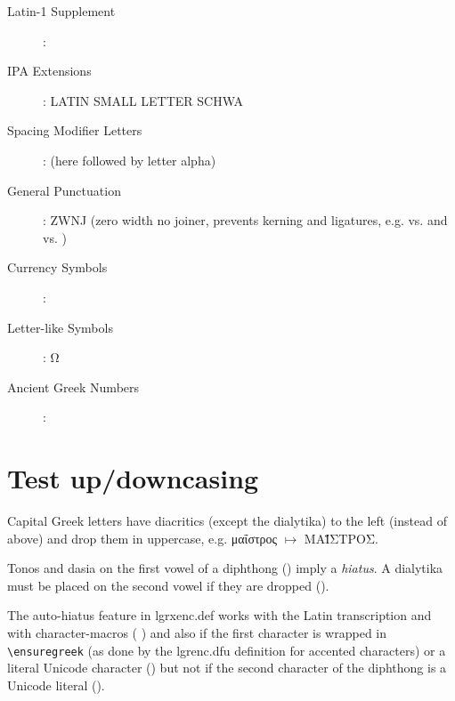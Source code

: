 \documentclass[a4paper]{article}
\begin{document}
{\begin{description}
\item [Latin-1 Supplement]: 
\item [IPA Extensions]:  LATIN SMALL LETTER SCHWA
\item [Spacing Modifier Letters]:
       (here followed by letter alpha)
\item [General Punctuation]:
       ZWNJ (zero width no joiner, prevents kerning
      and ligatures, e.g.  vs.  and
       vs. )
\item [Currency Symbols]: 
\item [Letter-like Symbols]: Ω  %
\item [Ancient Greek Numbers]: 
\end{description}

\newpage

\section{Test up/downcasing}

Capital Greek letters have diacritics (except the dialytika) to the left
(instead of above) and drop them in uppercase, e.g.
\foreignlanguage{greek}{μαΐστρος $\mapsto$ \MakeUppercase{μαΐστρος}}.

Tonos and dasia on the first vowel of a diphthong ()
imply a \emph{hiatus}. A dialytika must be placed on the second
vowel if they are dropped ().

The auto-hiatus feature in lgrxenc.def works with the Latin
transcription and with character-macros (%
)
and also if the first character is wrapped in \verb+\ensuregreek+ (as done by
the lgrenc.dfu definition for accented characters) or a literal Unicode
character
()
but not if the second character of the diphthong is a Unicode literal
().

}
\end{document}
